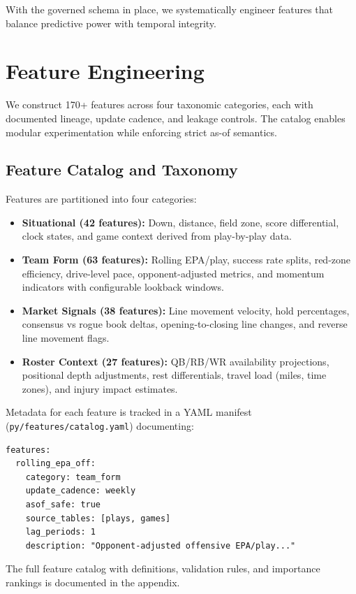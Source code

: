 With the governed schema in place, we systematically engineer features that balance predictive power with temporal integrity.

\section{Feature Engineering}
\label{sec:feature-engineering}

We construct 170+ features across four taxonomic categories, each with documented lineage, update cadence, and leakage controls. The catalog enables modular experimentation while enforcing strict as-of semantics.

\subsection{Feature Catalog and Taxonomy}
\label{subsec:feature-catalog}

Features are partitioned into four categories:
\begin{itemize}
  \item \textbf{Situational (42 features):} Down, distance, field zone, score differential, clock states, and game context derived from play-by-play data.
  \item \textbf{Team Form (63 features):} Rolling EPA/play, success rate splits, red-zone efficiency, drive-level pace, opponent-adjusted metrics, and momentum indicators with configurable lookback windows.
  \item \textbf{Market Signals (38 features):} Line movement velocity, hold percentages, consensus vs rogue book deltas, opening-to-closing line changes, and reverse line movement flags.
  \item \textbf{Roster Context (27 features):} QB/RB/WR availability projections, positional depth adjustments, rest differentials, travel load (miles, time zones), and injury impact estimates.
\end{itemize}

Metadata for each feature is tracked in a YAML manifest (\texttt{py/features/catalog.yaml}) documenting:
\begin{lstlisting}[basicstyle=\ttfamily\scriptsize]
features:
  rolling_epa_off:
    category: team_form
    update_cadence: weekly
    asof_safe: true
    source_tables: [plays, games]
    lag_periods: 1
    description: "Opponent-adjusted offensive EPA/play..."
\end{lstlisting}

The full feature catalog with definitions, validation rules, and importance rankings is documented in the appendix.

